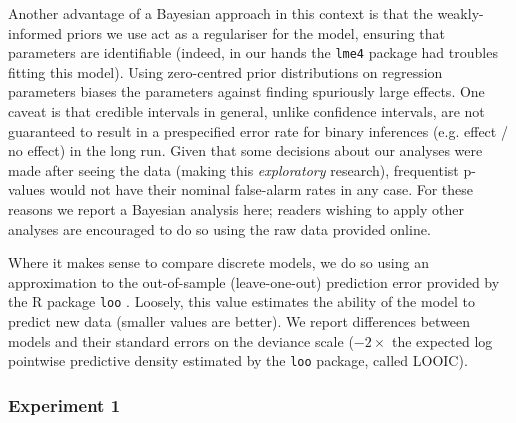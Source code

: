 \documentclass[article, 11pt,a4paper,natbib]{apa6}\usepackage[]{graphicx}\usepackage[]{color}
\begin{document}
Another advantage of a Bayesian approach in this context is that the weakly-informed priors we use act as a regulariser for the model, ensuring that parameters are identifiable (indeed, in our hands the \texttt{lme4} package had troubles fitting this model). 
Using zero-centred prior distributions on regression parameters biases the parameters against finding spuriously large effects.
One caveat is that credible intervals in general, unlike confidence intervals, are not guaranteed to result in a prespecified error rate for binary inferences (e.g. effect / no effect) in the long run.
Given that some decisions about our analyses were made after seeing the data (making this \textit{exploratory} research), frequentist p-values would not have their nominal false-alarm rates in any case.
For these reasons we report a Bayesian analysis here; readers wishing to apply other analyses are encouraged to do so using the raw data provided online.

Where it makes sense to compare discrete models, we do so using an approximation to the out-of-sample (leave-one-out) prediction error provided by the R package \texttt{loo} \citep[v 0.1.6;][]{vehtari_practical_2016}.
Loosely, this value estimates the ability of the model to predict new data (smaller values are better).
We report differences between models and their standard errors on the deviance scale ($-2 \times$ the expected log pointwise predictive density estimated by the \texttt{loo} package, called LOOIC).

\subsubsection{Experiment 1}
\end{document}

